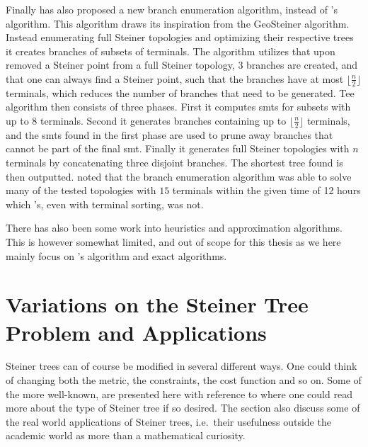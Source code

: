 Finally \textcite{fonseca2014} has also proposed a new branch enumeration
algorithm, instead of \citeauthor{smith1992}'s algorithm. This algorithm draws
its inspiration from the GeoSteiner algorithm. Instead enumerating full Steiner
topologies and optimizing their respective trees it creates branches of subsets
of terminals. The algorithm utilizes that upon removed a Steiner point from a
full Steiner topology, $3$ branches are created, and that one can always find a
Steiner point, such that the branches have at most $\lfloor \frac{n}{2} \rfloor$
terminals, which reduces the number of branches that need to be generated. Tee
algorithm then consists of three phases. First it computes \acp{smt} for subsets
with up to $8$ terminals. Second it generates branches containing up to
$\lfloor \frac{n}{2} \rfloor$ terminals, and the \acp{smt} found in the first
phase are used to prune away branches that cannot be part of the final
\ac{smt}. Finally it generates full Steiner topologies with $n$ terminals by
concatenating three disjoint branches. The shortest tree found is then
outputted. \citeauthor{fonseca2014} noted that the branch enumeration algorithm
was able to solve many of the tested topologies with $15$ terminals within the
given time of 12 hours which \citeauthor{smith1992}'s, even with terminal
sorting, was not.

There has also been some work into heuristics and approximation algorithms. This
is however somewhat limited, and out of scope for this thesis as we here mainly
focus on \citeauthor{smith1992}'s algorithm and exact algorithms.

\section{Variations on the Steiner Tree Problem and Applications}
\label{sec:vari-stein-tree}

Steiner trees can of course be modified in several different ways. One could
think of changing both the metric, the constraints, the cost function and so
on. Some of the more well-known, are presented here with reference to where one
could read more about the type of Steiner tree if so desired. The section also
discuss some of the real world applications of Steiner trees, i.e.\ their
usefulness outside the academic world as more than a mathematical curiosity.

